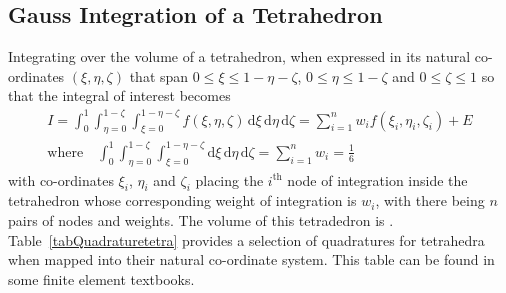 \subsection{Gauss Integration of a Tetrahedron}

Integrating over the volume of a tetrahedron, when expressed in its natural co-ordinates $( \xi , \eta , \zeta )$ that span $0 \leq \xi \leq 1 - \eta - \zeta$, $0 \leq \eta \leq 1 - \zeta$ and $0 \leq \zeta \leq 1$ so that the integral of interest becomes
\begin{multline}
     I = \int_0^1 \int_{\eta=0}^{1-\zeta} \int_{\xi = 0}^{1 - \eta - \zeta} 
     f ( \xi , \eta , \zeta ) \, \mathrm{d} \xi \, \mathrm{d} \eta \, 
     \mathrm{d} \zeta = \sum_{i=1}^n w_i f( \xi_i , \eta_i , \zeta_i ) + E \\
     \text{where} \quad 
     \int_0^1 \int_{\eta=0}^{1-\zeta} \int_{\xi = 0}^{1 - \eta - \zeta} 
     \mathrm{d} \xi \, \mathrm{d} \eta \, \mathrm{d} \zeta = \sum_{i=1}^n w_i = 
     \frac{1}{6}
\end{multline}
with co-ordinates $\xi_i$, $\eta_i$ and $\zeta_i$ placing the $i^{\text{th}}$ node of integration inside the tetrahedron whose corresponding weight of integration is $w_i$, with there being $n$ pairs of nodes and weights.  The volume of this tetradedron is .  Table~\ref{tabQuadraturetetra} provides a selection of quadratures for tetrahedra when mapped into their natural co-ordinate system.  This table can be found in some finite element textbooks.

